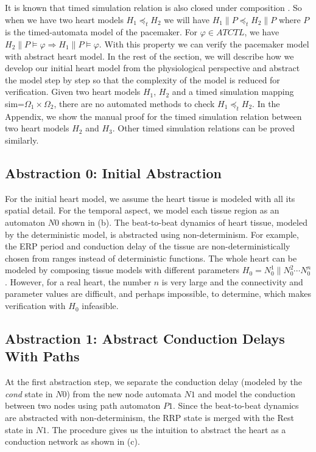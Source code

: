 It is known that timed simulation relation is also closed under composition \cite{simulation}. So when we have two heart models $H_1\preceq_t H_2$ we will have $H_1\| P\preceq_t H_2\| P$ where $P$ is the timed-automata model of the pacemaker. For $\varphi\in ATCTL$, we have $H_2\| P\models\varphi\Rightarrow H_1\| P\models\varphi$. With this property we can verify the pacemaker model with abstract heart model. In the rest of the section, we will describe how we develop our initial heart model from the physiological perspective and abstract the model step by step so that the complexity of the model is reduced for verification. Given two heart models $H_1$, $H_2$ and a timed simulation mapping \textsf{sim}=$\Omega_1\times\Omega_2$, there are no automated methods to check $H_1\preceq_t H_2$. In the Appendix, we show the manual proof for the timed simulation relation between two heart models $H_2$ and $H_3$. Other timed simulation relations can be proved similarly.

\subsection{Abstraction 0: Initial Abstraction}
For the initial heart model, we assume the heart tissue is modeled with all its spatial detail. For the temporal aspect, we model each tissue region as an automaton $N0$ shown in (b). The beat-to-beat dynamics of heart tissue, modeled by the deterministic model, is abstracted using non-determinism. For example, the ERP period and conduction delay of the tissue are non-deterministically chosen from ranges instead of deterministic functions. The whole heart can be modeled by composing tissue models with different parameters $H_0=N_0^1\|N_0^2\cdots N_0^n$. However, for a real heart, the number $n$ is very large and the connectivity and parameter values are difficult, and perhaps impossible, to determine, which makes verification with $H_0$ infeasible. 

\subsection{Abstraction 1: Abstract Conduction Delays With Paths}
At the first abstraction step, we separate the conduction delay (modeled by the \emph{cond} state in $N0$) from the new node automata $N1$ and model the conduction between two nodes using path automaton $P1$. Since the beat-to-beat dynamics are abstracted with non-determinism, the RRP state is merged with the Rest state in $N1$. The procedure gives us the intuition to abstract the heart as a conduction network as shown in  (c). 


